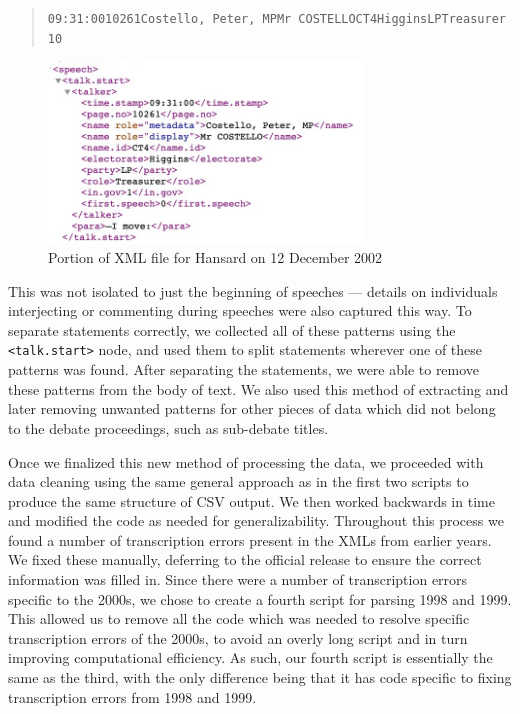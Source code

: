 \documentclass[
  letterpaper,
  DIV=11,
  numbers=noendperiod]{scrartcl}
\begin{document}
\begin{quote}
\texttt{09:31:0010261Costello,\ Peter,\ MPMr\ COSTELLOCT4HigginsLPTreasurer10}
\end{quote}

\begin{figure}

{\centering \includegraphics[width=3.28125in,height=\textheight]{patternEX.jpg}

}

\caption{\label{fig-patternEX}Portion of XML file for Hansard on 12
December 2002}

\end{figure}

This was not isolated to just the beginning of speeches --- details on
individuals interjecting or commenting during speeches were also
captured this way. To separate statements correctly, we collected all of
these patterns using the \texttt{\textless{}talk.start\textgreater{}}
node, and used them to split statements wherever one of these patterns
was found. After separating the statements, we were able to remove these
patterns from the body of text. We also used this method of extracting
and later removing unwanted patterns for other pieces of data which did
not belong to the debate proceedings, such as sub-debate titles.

Once we finalized this new method of processing the data, we proceeded
with data cleaning using the same general approach as in the first two
scripts to produce the same structure of CSV output. We then worked
backwards in time and modified the code as needed for generalizability.
Throughout this process we found a number of transcription errors
present in the XMLs from earlier years. We fixed these manually,
deferring to the official release to ensure the correct information was
filled in. Since there were a number of transcription errors specific to
the 2000s, we chose to create a fourth script for parsing 1998 and 1999.
This allowed us to remove all the code which was needed to resolve
specific transcription errors of the 2000s, to avoid an overly long
script and in turn improving computational efficiency. As such, our
fourth script is essentially the same as the third, with the only
difference being that it has code specific to fixing transcription
errors from 1998 and 1999.
\end{document}
